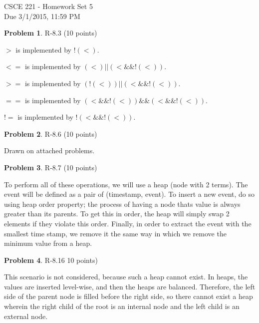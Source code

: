 \documentclass[12pt]{report}
\theoremstyle{definition}
\newtheorem{problem}{Problem}
\begin{document}
\vspace*{-15mm}
\begin{center}
{\large
				CSCE 221 - Homework Set 5 \\
				Due 3/1/2015, 11:59 PM}
\end{center}

\begin{problem} 	R-8.3 (10 points) 		
\end{problem}
				\begin{compactenum}[1.]
				\item $>$ is implemented by $!(<)$. \\
				\item $<=$ is implemented by $(<) || (< \&\&!(<))$. \\
				\item $>=$ is implemented by $(!(<)) || (<\&\&!(<))$. \\
				\item $==$ is implemented by $(<\&\& !(<)) \&\& (< \&\& !(<))$. \\
				\item $!=$ is implemented by $!(< \&\& !(<))$. \\
				\end{compactenum}

\begin{problem} 	R-8.6 (10 points) 		
\end{problem}
				Drawn on attached problems.

\begin{problem} 	R-8.7 (10 points) 		
\end{problem}
				To perform all of these operations, we will use a heap (node with 2 terms). The event will be 				defined as a pair of (timestamp, event). To insert a new event, do so using heap order 					property; the process of having a node thats value is always greater than its parents. To get 				this in order, the heap will simply swap 2 elements if they violate this order. Finally, in order to 				extract the event with the smallest time stamp, we remove it the same way in which we 					remove the minimum value from a heap.

\begin{problem} 	R-8.16 10 points) 		
\end{problem}
				This scenario is not considered, because such a heap cannot exist. In heaps, the values are 				inserted level-wise, and then the heaps are balanced. Therefore, the left side of the parent 				node is filled before the right side, so there cannot exist a heap wherein the right child of the 				root is an internal node and the left child is an external node.
				
\end{document}
